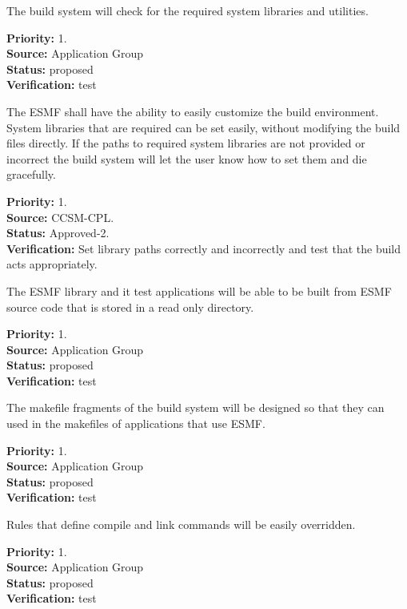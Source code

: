 The build system will check for the required system 
libraries and utilities.
\begin{reqlist}
{\bf Priority:} 1. \\
{\bf Source:} Application Group \\
{\bf Status:} proposed \\
{\bf Verification:} test
\end{reqlist}

The ESMF shall have the ability to easily customize the build environment. 
System libraries that are required can be set easily, without modifying 
the build files directly. If the paths to required system libraries 
are not provided or incorrect the build system will let the user know 
how to set them and die gracefully.
\begin{reqlist}
{\bf Priority:} 1. \\
{\bf Source:} CCSM-CPL. \\
{\bf Status:} Approved-2. \\
{\bf Verification:} Set library paths correctly and incorrectly and test that 
the build acts appropriately.
\end{reqlist}

The ESMF library and it test applications
will be able to be built from ESMF
source code that is stored in a
read only directory.

\begin{reqlist}
{\bf Priority:} 1. \\
{\bf Source:} Application Group \\
{\bf Status:} proposed \\
{\bf Verification:} test
\end{reqlist}

The makefile fragments of the build system will 
be designed so that they can used in the makefiles 
of applications that use ESMF.

\begin{reqlist}
{\bf Priority:} 1. \\
{\bf Source:} Application Group \\
{\bf Status:} proposed \\
{\bf Verification:} test
\end{reqlist}

Rules that define compile and link commands will be
easily overridden.

\begin{reqlist}
{\bf Priority:} 1. \\
{\bf Source:} Application Group \\
{\bf Status:} proposed \\
{\bf Verification:} test
\end{reqlist}


